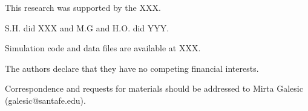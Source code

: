 \documentclass{nature}
\begin{document}

\begin{addendum}
 \item This research was supported by the XXX.
 \item[Author contribution] S.H. did XXX and M.G and H.O. did YYY.
 \item[Code availability] Simulation code and data files are available at XXX.
 \item[Competing Interests] The authors declare that they have no competing financial interests.
 \item[Correspondence] Correspondence and requests for materials should be addressed to Mirta Galesic (galesic@santafe.edu).
\end{addendum}
\end{document}
